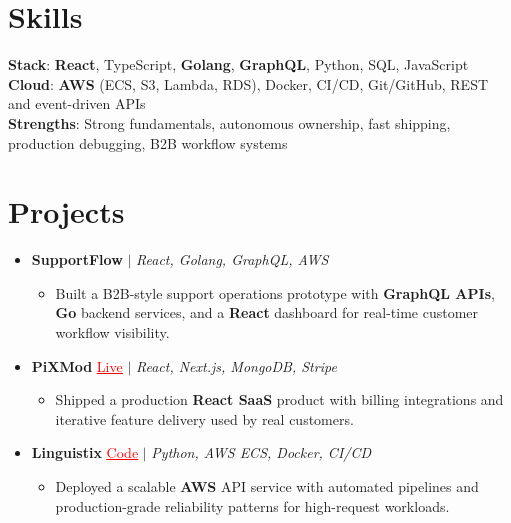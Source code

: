 \documentclass[letterpaper,10pt]{article}
\newcommand{\resumeItem}[1]{\item\small{{#1 \vspace{-2pt}}}}
\newcommand{\resumeProjectHeading}[1]{\item \small #1 \vspace{-2pt}}
\newcommand{\resumeSubHeadingListStart}{\begin{itemize}[leftmargin=0.0in, label={}]}
\newcommand{\resumeSubHeadingListEnd}{\end{itemize}}
\newcommand{\resumeProjItemListStart}{\begin{itemize}[leftmargin=0.15in,label=\textbullet,itemsep=0pt,topsep=0pt,parsep=0pt,partopsep=0pt]}
\newcommand{\resumeProjItemListEnd}{\end{itemize}\vspace{-4pt}}
\begin{document}
\section{Skills}
\begin{itemize}[leftmargin=0.15in, label={}]
\small{\item{
\textbf{Stack}: \textbf{React}, TypeScript, \textbf{Golang}, \textbf{GraphQL}, Python, SQL, JavaScript \\
\textbf{Cloud}: \textbf{AWS} (ECS, S3, Lambda, RDS), Docker, CI/CD, Git/GitHub, REST and event-driven APIs \\
\textbf{Strengths}: Strong fundamentals, autonomous ownership, fast shipping, production debugging, B2B workflow systems
}}
\end{itemize}
\vspace{-16pt}
\section{Projects}
\resumeSubHeadingListStart
\vspace{-2pt}
\resumeProjectHeading{\textbf{SupportFlow} $|$ \emph{React, Golang, GraphQL, AWS}}
\resumeProjItemListStart
\resumeItem{Built a B2B-style support operations prototype with \textbf{GraphQL APIs}, \textbf{Go} backend services, and a \textbf{React} dashboard for real-time customer workflow visibility.}
\resumeProjItemListEnd
\vspace{3pt}
\resumeProjectHeading{\textbf{PiXMod} {\href{https://pixmod.vercel.app/}{\textcolor{red}{\underline{Live}}}} $|$ \emph{React, Next.js, MongoDB, Stripe}}
\resumeProjItemListStart
\resumeItem{Shipped a production \textbf{React SaaS} product with billing integrations and iterative feature delivery used by real customers.}
\resumeProjItemListEnd
\vspace{3pt}
\resumeProjectHeading{\textbf{Linguistix} {\href{https://github.com/SAHAJ-BHADJA/Linguistix}{\textcolor{red}{\underline{Code}}}} $|$ \emph{Python, AWS ECS, Docker, CI/CD}}
\resumeProjItemListStart
\resumeItem{Deployed a scalable \textbf{AWS} API service with automated pipelines and production-grade reliability patterns for high-request workloads.}
\resumeProjItemListEnd
\resumeSubHeadingListEnd
\end{document}
